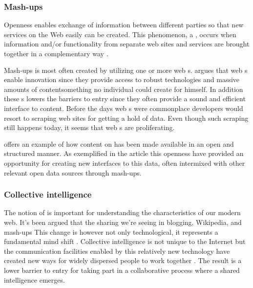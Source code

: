 \subsubsection{Mash-ups}
Openness enables exchange of information between
different parties so that new services on the Web easily can be created.
This phenomenon, a ,%
occurs when information and/or functionality from separate web sites and
services are brought together in a complementary way
\citep[]{murugesan07}.

Mash-ups is most often created by utilizing one or more web s.%
\citet[]{floyd07} argues that web s enable innovation since
they provide access to robust technologies and massive amounts of
content\dash{}something no individual could create for himself. In addition
these s lowers the barriers to entry since they often provide a
sound and efficient interface to content. Before the days web s were
commonplace developers would resort to scraping web sites for getting a hold
of data. Even though such scraping still happens today, it seems that web
s are proliferating.

\citet{auer07} offers an example of how content on %
has been made available in an open and structured manner. As exemplified
in the article this openness have provided an opportunity for creating new
interfaces to this data, often intermixed with other relevant open
data sources through mash-ups.

\removeline

\subsubsection{Collective intelligence}
The notion of  is important for understanding
the characteristics of our modern web. It's been argued that the sharing we're
seeing in blogging, Wikipedia, and mash-ups
This change is however not only technological, it represents a fundamental
mind shift \citep[]{kolbitsch06}.
Collective intelligence is not unique
to the Internet but the communication facilities enabled by this relatively
new technology have created new ways for widely dispersed people to work
together \citep{mitcenter08}. The result is a lower barrier to entry for
taking part in a collaborative process where a shared intelligence emerges.

